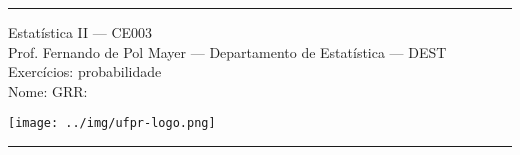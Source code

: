 \documentclass[a4paper,11pt,fleqn]{article}\usepackage[]{graphicx}\usepackage[]{color}
\theoremstyle{definition}
\begin{document}
\reversemarginpar %





\hrule
\vspace{0.3cm}

\begin{minipage}[c]{.85\textwidth}
  Estatística II --- CE003 \\
  Prof. Fernando de Pol Mayer --- Departamento de Estatística --- DEST \\
  Exercícios: probabilidade \\
  Nome:   \hfill GRR: \hspace{2cm}
\end{minipage}\hfill
\begin{minipage}[c]{.15\textwidth}
\flushright
\texttt{[image: ../img/ufpr-logo.png]}
\end{minipage}

\vspace{0.3cm}
\hrule
\vspace{0.3cm}
\end{document}
